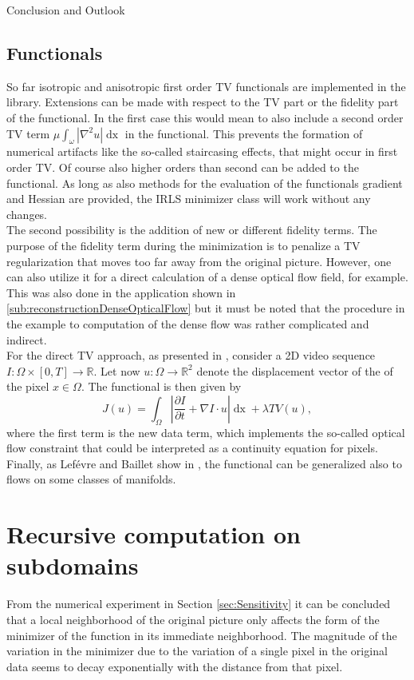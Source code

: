 \begin{chapter}{Conclusion and Outlook}
\subsection{Functionals} %
\label{sub:Functionals}
So far isotropic and anisotropic first order TV functionals are implemented in the library. Extensions can be made with respect to the TV part or the fidelity
part of the functional. In the first case this would mean to also include a second order TV term $\mu\int_{\omega}|\nabla^2u|\mathop{dx}$ in the functional.
This prevents the formation of numerical artifacts like the so-called staircasing effects, that might occur in first order TV. Of course also higher orders than second
can be added to the functional. As long as also methods for the evaluation of the functionals gradient and Hessian are provided, the IRLS minimizer class will
work without any changes. \\

The second possibility is the addition of new or different fidelity terms. The purpose of the fidelity term during the minimization is to penalize a TV
regularization that moves too far away from the original picture. However, one can also utilize it for a direct calculation of a dense optical flow field, for
example. This was also done in the application shown in \ref{sub:reconstructionDenseOpticalFlow} but it must be noted that the procedure in the example to computation of the dense flow was rather complicated and indirect.\\

For the direct TV approach, as presented in \cite{SceneFlow}, consider a 2D video sequence $I:\Omega\times [0,T]\to\mathbb{R}$.
Let now $u:\Omega\to\mathbb{R}^2$ denote the displacement vector of the of the pixel $x\in\Omega$. The functional is then given by
\begin{equation}
    J(u)=\int_{\Omega}\left\vert\frac{\partial I}{\partial t}+\nabla I\cdot u\right\vert\mathop{dx}+\lambda TV(u),
\end{equation}
where the first term is the new data term, which implements the so-called optical flow constraint that could be interpreted as a continuity equation for pixels.
Finally, as Lef\'{e}vre and Baillet show in \cite{manifoldFlow}, the functional can be generalized also to flows on some classes of manifolds.


\section{Recursive computation on subdomains} %
\label{sec:Recursivecomputationonsubdomains}
From the numerical experiment in Section \ref{sec:Sensitivity} it can be concluded that a local neighborhood of the original picture only affects the form of the minimizer of the function
in its immediate neighborhood. The magnitude of the variation in the minimizer due to the variation of a single pixel in the original data seems to decay exponentially with the
distance from that pixel. \\


\end{chapter}
